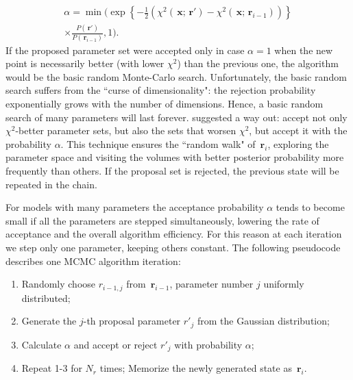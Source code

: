 \documentclass[preprint2]{aastex}
\newcommand{\bfr}{\,\mathbf{r}}
\newcommand{\bfx}{\,\mathbf{x}}
\begin{document}
\begin{eqnarray}
  \label{accept_probab3}
  \alpha = \min \biggl( \exp \left\lbrace -\frac{1}{2}\left( \chi^2(\bfx;\bfr') -
                         \chi^2(\bfx;\bfr_{i-1}) \right)  \right\rbrace                   \nonumber \\
          \times \frac{P(\bfr')} {P(\bfr_{i-1})}, 1 \biggr) .    
\end{eqnarray}
If the proposed parameter set were accepted only in case $\alpha=1$ when the new point is necessarily better (with lower $\chi^2$) than the previous one, the algorithm would be the basic random Monte-Carlo search. Unfortunately, the basic random search suffers from the ``curse of dimensionality": the rejection probability exponentially grows with the number of dimensions. Hence, a basic random search of many parameters will last forever. \citet{Metropolis_etal_1953} suggested a way out: accept not only $\chi^2$-better parameter sets, but also the sets that worsen $\chi^2$, but accept it with the probability $\alpha$. This technique ensures the ``random walk" of $\bfr_i$, exploring the parameter space and visiting the volumes with better posterior probability more frequently than others. If the proposal set is rejected, the previous state will be repeated in the chain.

For models with many parameters the acceptance probability $\alpha$ tends to become small if all the parameters are stepped simultaneously, lowering the rate of acceptance and the overall algorithm efficiency. For this reason at each iteration we step only one parameter, keeping others constant. The following pseudocode describes one MCMC algorithm iteration:
\begin{enumerate}
\item Randomly choose $r_{i-1,j}$ from $\bfr_{i-1}$, parameter number $j$ uniformly distributed;
\item Generate the $j$-th proposal parameter $r'_j$ from the Gaussian distribution;
\item Calculate $\alpha$ and accept or reject $r'_j$ with probability $\alpha$;
\item Repeat 1-3 for $N_r$ times; Memorize the newly generated state as $\bfr_i$.
\end{enumerate}
\end{document}
